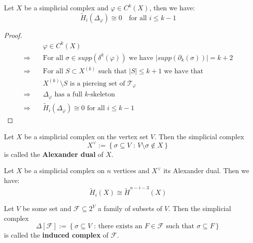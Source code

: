 \begin{thm}
Let \(X\) be a simplicial complex and \(\varphi\in C^k(X)\), then we have:
\[
\tilde{H}_i(\Delta_{\varphi})\cong 0\quad\text{for all }i\leq k-1
\]
\begin{proof}
\begin{align*}
& \varphi\in C^k(X) \\
\Longrightarrow \quad & \text{For all }\sigma\in supp(\delta^k(\varphi))\text{ we have }\left|supp(\partial_k(\sigma))\right|=k+2 \\
\Longrightarrow \quad & \text{For all }S\subset X^{(k)}\text{ such that }\left|S\right|\leq k+1\text{ we have that } \\ & X^{(k)}\setminus S\text{ is a piercing set of }\mathcal{T}_{\varphi} \\
\Longrightarrow \quad & \Delta_{\varphi}\text{ has a full }k\text{-skeleton} \\
\Longrightarrow \quad & \tilde{H}_i(\Delta_{\varphi})\cong 0\text{ for all }i\leq k-1
\end{align*}
\end{proof}
\end{thm}

\begin{defi}
Let \(X\) be a simplicial complex on the vertex set \(V\). Then the simplicial complex
\[
X^{\lor}:=\left\{\sigma\subseteq V\text{ : }V\setminus\sigma\notin X\right\}
\]
is called the \textbf{Alexander dual} of \(X\).
\end{defi}

\begin{thm}\label{theorem12}
Let \(X\) be a simplicial complex on \(n\) vertices and \(X^{\lor}\) its Alexander dual. Then we have:
\[
\tilde{H}_i(X)\cong\tilde{H}^{n-i-3}(X)
\]
\end{thm}

\begin{defi}
Let \(V\) be some set and \(\mathcal{F}\subseteq 2^V\) a family of subsets of \(V\). Then the simplicial complex
\[
\Delta\left[\mathcal{F}\right]:=\left\{\sigma\subseteq V\text{ : there exists an }F\in\mathcal{F}\text{ such that }\sigma\subseteq F\right\}
\]
is called the \textbf{induced complex} of \(\mathcal{F}\). 
\end{defi}

